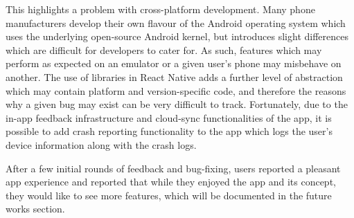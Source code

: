 This highlights a problem with cross-platform development. Many phone manufacturers develop their own flavour of the Android operating system which uses the underlying open-source Android kernel, but introduces slight differences which are difficult for developers to cater for. As such, features which may perform as expected on an emulator or a given user's phone may misbehave on another. The use of libraries in React Native adds a further level of abstraction which may contain platform and version-specific code, and therefore the reasons why a given bug may exist can be very difficult to track. Fortunately, due to the in-app feedback infrastructure and cloud-sync functionalities of the app, it is possible to add crash reporting functionality to the app which logs the user's device information along with the crash logs.

After a few initial rounds of feedback and bug-fixing, users reported a pleasant app experience and reported that while they enjoyed the app and its concept, they would like to see more features, which will be documented in the future works section.